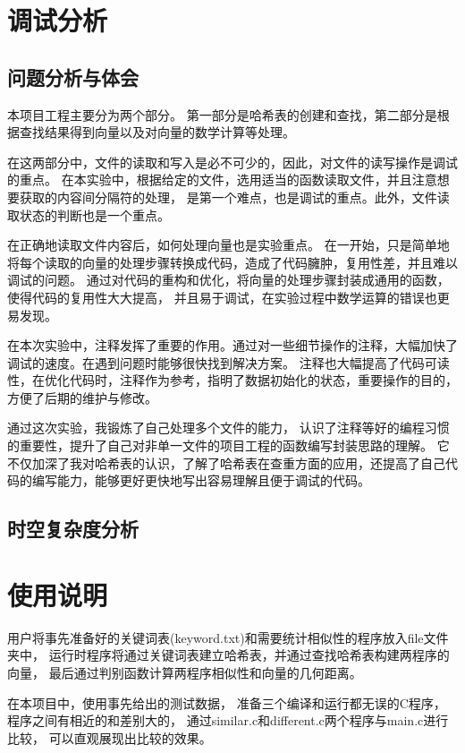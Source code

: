 \documentclass[a4paper]{article}
\begin{document}
	\section{调试分析}\label{sec:debug}

	\subsection{问题分析与体会}\label{subsec:analysis}
	{{本项目工程主要分为两个部分。
	第一部分是哈希表的创建和查找，第二部分是根据查找结果得到向量以及对向量的数学计算等处理。}}

	{在这两部分中，文件的读取和写入是必不可少的，因此，对文件的读写操作是调试的重点。
	在本实验中，根据给定的文件，选用适当的函数读取文件，并且注意想要获取的内容间分隔符的处理，
	是第一个难点，也是调试的重点。此外，文件读取状态的判断也是一个重点。}

	{{在正确地读取文件内容后，如何处理向量也是实验重点。
	在一开始，只是简单地将每个读取的向量的处理步骤转换成代码，造成了代码臃肿，复用性差，并且难以调试的问题。
	通过对代码的重构和优化，将向量的处理步骤封装成通用的函数，使得代码的复用性大大提高，
	并且易于调试，在实验过程中数学运算的错误也更易发现。}}

	{{在本次实验中，注释发挥了重要的作用。通过对一些细节操作的注释，大幅加快了调试的速度。在遇到问题时能够很快找到解决方案。
	注释也大幅提高了代码可读性，在优化代码时，注释作为参考，指明了数据初始化的状态，重要操作的目的，方便了后期的维护与修改。}}

	{{通过这次实验，我锻炼了自己处理多个文件的能力，
	认识了注释等好的编程习惯的重要性，提升了自己对非单一文件的项目工程的函数编写封装思路的理解。
	它不仅加深了我对哈希表的认识，了解了哈希表在查重方面的应用，还提高了自己代码的编写能力，能够更好更快地写出容易理解且便于调试的代码。}}

	\subsection{时空复杂度分析}\label{subsec:analysis2}


	\section{使用说明}\label{sec:instrut}
	{{用户将事先准备好的关键词表(keyword.txt)和需要统计相似性的程序放入file文件夹中，
	运行时程序将通过关键词表建立哈希表，并通过查找哈希表构建两程序的向量，
	最后通过判别函数计算两程序相似性和向量的几何距离。}}

	{{在本项目中，使用事先给出的测试数据，
	准备三个编译和运行都无误的C程序，程序之间有相近的和差别大的，
	通过similar.c和different.c两个程序与main.c进行比较，
	可以直观展现出比较的效果。}}
\end{document}
